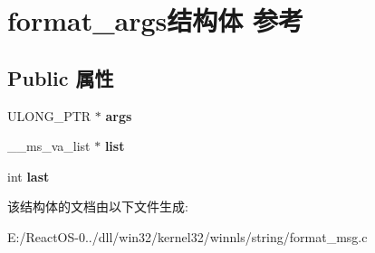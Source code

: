 \hypertarget{structformat__args}{}\section{format\+\_\+args结构体 参考}
\label{structformat__args}
\subsection*{Public 属性}
\begin{DoxyCompactItemize}
\item 
\mbox{\label{structformat__args_ad80333df309389ae280f1b86ba9cffc2}} 
U\+L\+O\+N\+G\+\_\+\+P\+TR $\ast$ {\bfseries args}
\item 
\mbox{\label{structformat__args_a5de250bbfa1373d6bbef20d4ba93e452}} 
\+\_\+\+\_\+ms\+\_\+va\+\_\+list $\ast$ {\bfseries list}
\item 
\mbox{\label{structformat__args_a90abf8c2d856dc6188a45088db2fdabe}} 
int {\bfseries last}
\end{DoxyCompactItemize}


该结构体的文档由以下文件生成\+:\begin{DoxyCompactItemize}
\item 
E\+:/\+React\+O\+S-\/0../dll/win32/kernel32/winnls/string/format\+\_\+msg.\+c\end{DoxyCompactItemize}
